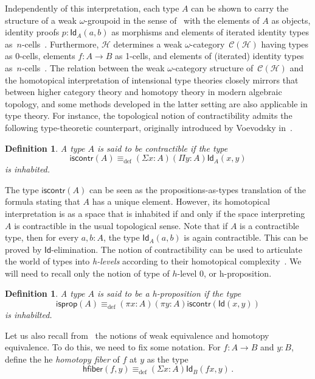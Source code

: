 \documentclass[reqno,10pt,a4paper,oneside]{amsart}
\numberwithin{equation}{section}
\theoremstyle{mythm}
\theoremstyle{mydef}
\newtheorem{definition}[theorem]{Definition}
\theoremstyle{myrmk}
\newcommand{\deq}{\equiv}
\newcommand{\defeq}{\deq_{\mathrm{def}}}
\newcommand{\Hint}{\mathcal{H}}
\newcommand{\iscontr}{\mathsf{iscontr}}
\newcommand{\isprop}{\mathsf{isprop}}
\newcommand{\hfiber}{\mathsf{hfiber}}
\newcommand{\Id}{\mathsf{Id}}
\newcommand{\id}[1]{\Id_{#1}}
\begin{document}
Independently of this interpretation, each type $A$ can be shown to carry the structure of a weak 
$\omega$-groupoid in the sense of~\cite{BataninM:mongcn,LeinsterT:higohc} with the elements of $A$ as objects, identity proofs $p : \id{A}(a,b)$ as morphisms and 
 elements of iterated identity types 
 as~$n$-cells~\cite{vandenBergB:typwg,LumsdaineP:weaci}. Furthermore, $\Hint$ 
 determines a weak $\omega$-category~$\mathcal{C}(\Hint)$ having types as 0-cells, elements $f : A \rightarrow B$ as 1-cells, and elements of (iterated) identity types 
as~$n$-cells~\cite{Lumsdaine:higcft}.   The relation between the weak $\omega$-category structure of~$\mathcal{C}(\Hint)$ and the homotopical interpretation of intensional type theories closely mirrors that between higher category theory and homotopy theory in modern algebraic topology, and some methods developed in the latter setting are also applicable in type theory.  For instance,
 the topological notion of contractibility admits the following type-theoretic counterpart, originally
 introduced by Voevodsky in~\cite{VoevodskyV:unifc}.


\begin{definition}  A type $A$ is said to be \emph{contractible} if the  type 
 \begin{equation}
 \label{eq:contractible}
\iscontr(A) \defeq (\Sigma x:A)(\Pi y:A)\id{A}(x,y)
\end{equation}
is inhabited.
\end{definition} 

The type $\iscontr(A)$ can be seen as the propositions-as-types translation
of the formula stating that $A$ has a unique element. However, its homotopical interpretation 
is as a space that is inhabited if and only if the space interpreting $A$ is contractible in the usual
topological sense. Note that if $A$ is a contractible type, then for every $a, b : A$, the type $\id{A}(a,b)$ is again contractible. 
This can be proved  by $\Id$-elimination. The notion of contractibility can be used to articulate the world of types  into \emph{h-levels} according to their
homotopical complexity~\cite{VoevodskyV:unifc}. We will need to recall only the notion of type of $h$-level 0, or h-proposition.

\begin{definition} A type $A$ is said to be a \emph{h-proposition} if the type
\[
\isprop(A) \defeq (\pi x : A)(\pi y : A) \iscontr( \Id(x,y)) 
\]
is inhabilted.
\end{definition}


Let us also recall from~\cite{VoevodskyV:unifc} the notions of weak equivalence and homotopy equivalence. To do this, we need to fix some notation. For $f : A \rightarrow B$ and $y : B$, define the he \emph{homotopy fiber} of $f$ at $y$ as the type
\[
 \hfiber(f,y) \defeq (\Sigma x : A) \id{B}(f x, y) \, .
\]
\end{document}
